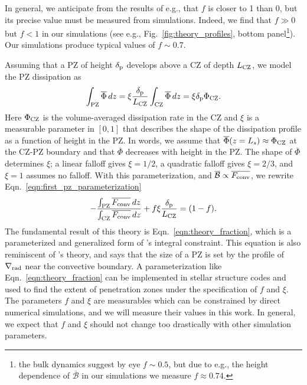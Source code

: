 \documentclass[twocolumn]{aastex631}
\newcommand{\gradrad}{\ensuremath{\nabla_{\rm{rad}}}}
\newcommand{\delp}{\ensuremath{\delta_{\rm{p}}}}
\newcommand{\Fconv}{\ensuremath{F_{\rm{conv}}}}
\renewcommand{\bar}[1]{\overline{#1}}
\begin{document}
In general, we anticipate from the results of e.g., \citet{currie_browning_2017} that $f$ is closer to 1 than 0, but its precise value must be measured from simulations.
Indeed, we find that $f \gg 0$ but $f < 1$ in our simulations (see e.g., Fig.~\ref{fig:theory_profiles}, bottom panel\footnote{the bulk dynamics suggest by eye $f \sim 0.5$, but due to e.g., the height dependence of $\bar{\mathcal{B}}$ in our simulations we measure $f \approx 0.74$.}).
Our simulations produce typical values of $f \sim 0.7$.

Assuming that a PZ of height $\delp$ develops above a CZ of depth $L_{\rm{CZ}}$, we model the PZ dissipation as
\begin{equation}
\int_{\rm{PZ}} \bar{\Phi}\,dz = \xi\frac{\delp}{L_{\rm{CZ}}}\int_{\rm{CZ}}\bar{\Phi}\,dz = \xi \delp \Phi_{\rm{CZ}}.
\label{eqn:xi_defn}
\end{equation}
Here $\Phi_{\rm{CZ}}$ is the volume-averaged dissipation rate in the CZ and $\xi$ is a measurable parameter in ${[0, 1]}$ that describes the shape of the dissipation profile as a function of height in the PZ.
In words, we assume that $\bar{\Phi}(z = L_s) \approx \Phi_{\rm{CZ}}$ at the CZ-PZ boundary and that $\bar{\Phi}$ decreases with height in the PZ.
The shape of $\bar{\Phi}$ determines $\xi$; a linear falloff gives $\xi = 1/2$, a quadratic falloff gives $\xi = 2/3$, and $\xi = 1$ assumes no falloff.
With this parameterization, and $\bar{\mathcal{B}} \propto \bar{\Fconv}$, we rewrite Eqn.~\ref{eqn:first_pz_parameterization}
\begin{equation}
-\frac{\int_{\rm{PZ}}\bar{\Fconv}\,dz}{\int_{\rm{CZ}}\bar{\Fconv}\,dz} + f\xi\frac{\delp}{L_{\rm{CZ}}}
= (1 - f).
\label{eqn:theory_fraction}
\end{equation}
The fundamental result of this theory is Eqn.~\ref{eqn:theory_fraction}, which is a parameterized and generalized form of \citet{roxburgh1989}'s integral constraint.
This equation is also reminiscent of \citet{zahn1991}'s theory, and says that the size of a PZ is set by the profile of $\gradrad$ near the convective boundary.
A parameterization like Eqn.~\ref{eqn:theory_fraction} can be implemented in stellar structure codes and used to find the extent of penetration zones under the specification of $f$ and $\xi$.
The parameters $f$ and $\xi$ are measurables which can be constrained by direct numerical simulations, and we will measure their values in this work.
In general, we expect that $f$ and $\xi$ should not change too drastically with other simulation parameters.
\end{document}
